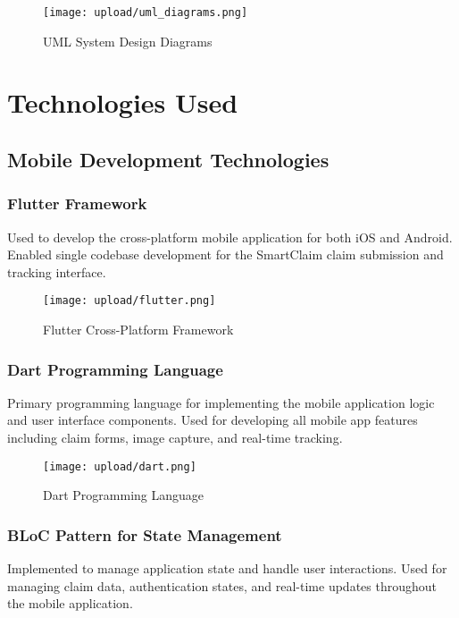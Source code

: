 \documentclass[12pt,a4paper]{report}
\begin{document}
\begin{figure}[H]
    \centering
    \texttt{[image: upload/uml\_diagrams.png]}
    \caption{UML System Design Diagrams}
    \label{fig:uml}
\end{figure}



\section{Technologies Used}

\subsection{Mobile Development Technologies}

\subsubsection{Flutter Framework}
Used to develop the cross-platform mobile application for both iOS and Android. Enabled single codebase development for the SmartClaim claim submission and tracking interface.

\begin{figure}[H]
    \centering
    \texttt{[image: upload/flutter.png]}
    \caption{Flutter Cross-Platform Framework}
    \label{fig:flutter}
\end{figure}

\subsubsection{Dart Programming Language}
Primary programming language for implementing the mobile application logic and user interface components. Used for developing all mobile app features including claim forms, image capture, and real-time tracking.

\begin{figure}[H]
    \centering
    \texttt{[image: upload/dart.png]}
    \caption{Dart Programming Language}
    \label{fig:dart}
\end{figure}

\subsubsection{BLoC Pattern for State Management}
Implemented to manage application state and handle user interactions. Used for managing claim data, authentication states, and real-time updates throughout the mobile application.
\end{document}
